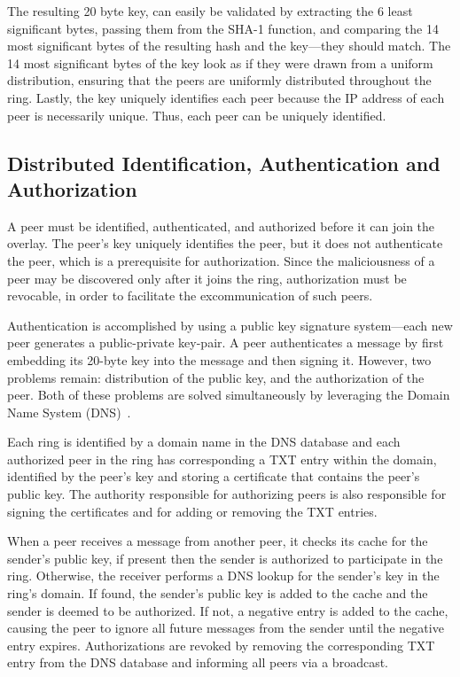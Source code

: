 \documentclass[11pt]{article}
\begin{document}
The resulting 20 byte key, can easily be validated by extracting
the 6 least significant bytes, passing them from the SHA-1 function,
and comparing the 14 most significant bytes of the resulting hash
and the key---they should match.  The 14 most significant bytes of
the key look as if they were drawn from a uniform distribution,
ensuring that the peers are uniformly distributed throughout the
ring.  Lastly, the key uniquely identifies each peer because the
IP address of each peer is necessarily unique.  Thus, each peer 
can be uniquely identified.


\subsection{Distributed Identification, Authentication and Authorization}
A peer must be identified, authenticated, and authorized before it can
join the overlay.  The peer's key uniquely identifies the peer, but it
does not authenticate the peer, which is a prerequisite for authorization.  
Since the maliciousness of a peer may be discovered only after it joins 
the ring, authorization must be revocable, in order to facilitate the 
excommunication of such peers.

Authentication is accomplished by using a public key signature
system---each new peer generates a public-private key-pair.  A peer
authenticates a message by first embedding its 20-byte key into the
message and then signing it.  However, two problems remain:
distribution of the public key, and the authorization of the peer.
Both of these problems are solved simultaneously by leveraging the
Domain Name System (DNS)~\cite{rfc1034,rfc1035}.

Each ring is identified by a domain name in the DNS database and
each authorized peer in the ring has corresponding a TXT entry
within the domain, identified by the peer's key and storing a
certificate that contains the peer's public key.  The authority
responsible for authorizing peers is also responsible for signing
the certificates and for adding or removing the TXT entries.

When a peer receives a message from another peer, it checks its
cache for the sender's public key, if present then the sender is
authorized to participate in the ring.  Otherwise, the receiver
performs a DNS lookup for the sender's key in the ring's domain.
If found, the sender's public key is added to the cache and the
sender is deemed to be authorized.  If not, a negative entry is
added to the cache, causing the peer to ignore all future messages
from the sender until the negative entry expires.  Authorizations
are revoked by removing the corresponding TXT entry from the DNS
database and informing all peers via a broadcast.
\end{document}
